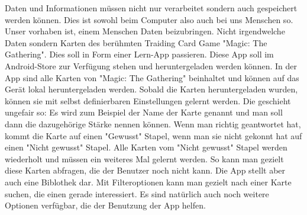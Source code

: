Daten und Informationen müssen nicht nur verarbeitet sondern auch gespeichert werden können. Dies ist sowohl beim Computer also auch bei uns Menschen so. Unser vorhaben ist, einem Menschen Daten beizubringen. Nicht irgendwelche Daten sondern Karten des berühmten Traiding Card Game "Magic: The Gathering". Dies soll in Form einer Lern-App passieren. Diese App soll im Android-Store zur Verfügung stehen und heruntergeladen werden können. In der App sind alle Karten von "Magic: The Gathering" beinhaltet und können auf das Gerät lokal heruntergeladen werden. Sobald die Karten heruntergeladen wurden, können sie mit selbst definierbaren Einstellungen gelernt werden. Die geschieht ungefair so: Es wird zum Beispiel der Name der Karte genannt und man soll dann die dazugehörige Stärke nennen können. Wenn man richtig geantwortet hat, kommt die Karte auf einen "Gewusst" Stapel, wenn man sie nicht gekonnt hat auf einen "Nicht gewusst" Stapel. Alle Karten vom "Nicht gewusst" Stapel werden wiederholt und müssen ein weiteres Mal gelernt werden. So kann man gezielt diese Karten abfragen, die der Benutzer noch nicht kann. Die App stellt aber auch eine Biblothek dar. Mit Filteroptionen kann man gezielt nach einer Karte suchen, die einen gerade interessiert. Es sind natürlich auch noch weitere Optionen verfügbar, die der Benutzung der App helfen.